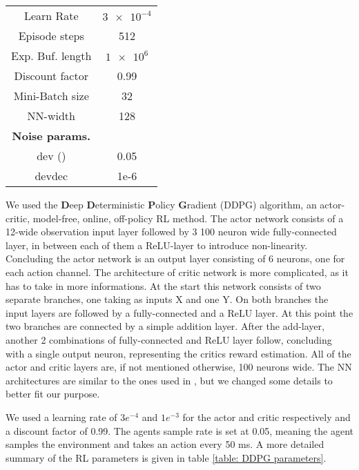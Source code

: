 \begin{table}
{\begin{tabular}{| c | c |}
		Learn Rate & $\num{3e-4}$ \\
		
		Episode steps & 512 \\
		
		Exp. Buf. length & $\num{1e6}$ \\
		
		Discount factor &  0.99 \\
		
		Mini-Batch size & 32 \\
		
		NN-width & 128 \\
		
		\hline
		\textbf{Noise params.} &  \\ [0.5ex] 
		\hline
		
		dev (\textsigma) & 0.05 \\
		
		devdec & 1e-6 \\
		
		\hline
		\end{tabular}
		\caption[PPO agent parameters]{}
		\label{table:PPO parameters}
	}
\end{table}


We used the \textbf{D}eep \textbf{D}eterministic \textbf{P}olicy \textbf{G}radient (DDPG) algorithm, an actor-critic, model-free, online, off-policy RL method.
The actor network consists of a 12-wide observation input layer followed by 3 100 neuron wide fully-connected layer, in between each of them a ReLU-layer to introduce non-linearity.
Concluding the actor network is an output layer consisting of 6 neurons, one for each action channel.
The architecture of critic network is more complicated, as it has to take in more informations.
At the start this network consists of two separate branches, one taking as inputs X and one Y.
On both branches the input layers are followed by a fully-connected and a ReLU layer.
At this point the two branches are connected by a simple addition layer.
After the add-layer, another 2 combinations of fully-connected and ReLU layer follow, concluding with a single output neuron, representing the critics reward estimation.
All of the actor and critic layers are, if not mentioned otherwise, 100 neurons wide.
The NN architectures are similar to the ones used in \parencite{AUTHOR}, but we changed some details to better fit our purpose.

We used a learning rate of $3e^{-4}$ and $1e^{-3}$ for the actor and critic respectively and a discount factor of 0.99.
The agents sample rate is set at 0.05, meaning the agent samples the environment and takes an action every 50 ms.
A more detailed summary of the RL parameters is given in table \ref{table: DDPG parameters}.


